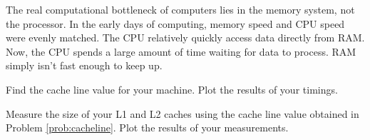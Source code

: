 
The real computational bottleneck of computers lies in the memory system, not the processor.  In the early days of computing, memory speed and CPU speed were evenly matched.  The CPU relatively quickly access data directly from RAM.  Now, the CPU spends a large amount of time waiting for data to process.  RAM simply isn't fast enough to keep up.



\begin{problem}
Find the cache line value for your machine.  Plot the results of your timings.
\label{prob:cacheline}
\end{problem}

\begin{problem}
Measure the size of your L1 and L2 caches using the cache line value obtained in
Problem \ref{prob:cacheline}.  Plot the results of your measurements.
\end{problem}

